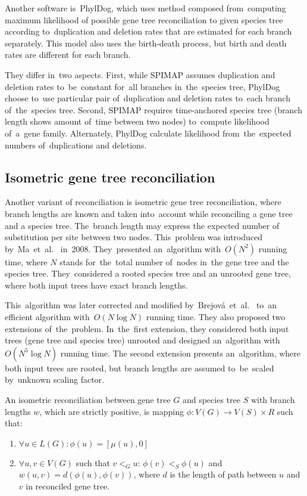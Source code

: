 Another software is~PhylDog\cite{phyldog}, which uses method composed from~computing maximum likelihood of possible gene tree reconciliation to given species tree according to~duplication and deletion rates that are estimated for each branch separately. This model also uses the birth-death process, but birth and death rates are different for each branch.

They differ in~two aspects. First, while SPIMAP assumes duplication and deletion rates to~be~constant for~all branches in~the~species tree, PhylDog choose to~use particular pair of~duplication and deletion rates to~each branch of~the~species tree. Second, SPIMAP requires time-anchored species tree (branch length shows amount of~time between two nodes) to~compute likelihood of~a~gene family. Alternately, PhylDog calculate likelihood from~the~expected numbers of~duplications and deletions. 


\subsection{Isometric gene tree reconciliation}
Another variant of reconciliation is isometric gene tree reconciliation, where branch lengths are known and taken into~account while reconciling a gene tree and a species tree. The~branch length may express the expected number of substitution per site between two nodes. This~problem was introduced by~Ma~et~al.~\cite{ma} in~2008. They~presented an~algorithm with~$O(N^2)$ running time, where $N$ stands for~the~total number of~nodes in~the gene tree and the species tree. They~considered a rooted species tree and an unrooted gene tree, where both input trees have exact branch lengths.

This~algorithm was later corrected and modified by~Brejová~et~al.~\cite{brejova} to~an efficient algorithm with~$O(N \log N)$ running time. They also proposed two extensions of~the~problem. In~the~first extension, they considered both input trees (gene tree and species tree) unrooted and designed an~algorithm with~$O(N^5 \log N)$ running time. The second extension presents an~algorithm, where both input trees are rooted, but branch lengths are assumed to~be~scaled by~unknown scaling factor.

\begin{definition}
An isometric reconciliation between gene tree $G$ and species tree $S$ with branch lengths $w$, which are strictly positive, is mapping $\phi: V(G) \rightarrow V(S) \times R$ such that:
	\begin{enumerate}\itemsep0em
	\item $\forall u \in L(G): \phi(u) = [\mu(u), 0]$
	\item $\forall u, v \in V(G)$ such that $v<_Gu$: $\phi(v)<_S\phi(u)$ and $w(u, v) = d(\phi(u), \phi(v))$, where $d$ is the length of path between $u$ and $v$ in reconciled gene tree.
	\end{enumerate}
\end{definition}

